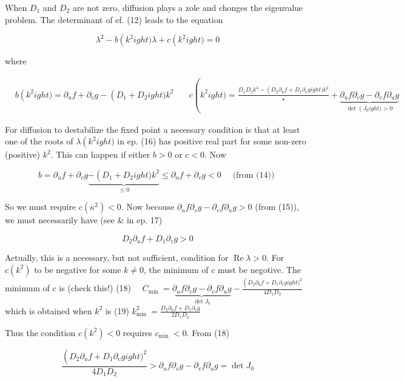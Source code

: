 When $D_{1}$ and $D_{2}$ are not zero, diffusion plays a zole and chonges the eigenvalue problem. The determinant of ef. (12) leads to the equation


\begin{equation*} 
\lambda^{2}-b
\left(k^{2}
ight) \lambda+c
\left(k^{2}
ight)=0 \tag{16}
\end{equation*} 

where

\begin{align*}
& b
\left(k^{2}
ight)=\partial_{u} f+\partial_{v} g-\left(D_{1}+D_{2}
ight) k^{2} \quad \tag{17}
& c
\left(k^{2}
ight)=\frac{D_{1} D_{2} k^{4}-\left(D_{2} \partial_{u} f+D_{1} \partial_{v} g
ight) k^{2}}{\star}+\underbrace{\partial_{u} f \partial_{v} g-\partial_{v} f \partial_{u} g}_{\operatorname{det}
\left(J_{0}
ight)>0}
\end{align*} 

For diffusion to destabilize the fixed point a necessary condition is that at least one of the roots of $\lambda
\left(k^{2}
ight)$ in ep. (16) has positive real part for some non-zero (positive) $k^{2}$. This can happen if either $b>0$ or $c<0$. Now

$$ 
b=\partial_{u} f+\partial_{v} g \underbrace{-\left(D_{1}+D_{2}
ight) k^{2}}_{\leqslant 0} \leqslant \partial_{u} f+\partial_{v} g<0 \quad \text { (from (14)) } $$ 

So we must require $c
\left(\kappa^{2}
\right)<0$. Now becouse $\partial_{u} f \partial_{v} g-\partial_{v} f \partial_{u} g>0$ (from (15)), we must necessarily have (see & in ep. 17)

$$ 
D_{2} \partial_{u} f+D_{1} \partial_{v} g>0
$$ 

Actually, this is a necessary, but not sufficient, condition for $\operatorname{Re} \lambda>0$. For $c
\left(k^{2}
\right)$ to be negative for some $k \neq 0$, the minimum of $c$ must be negotive. The minimum of $c$ is (check this!)
(18) $\quad C_{\text {min }}=\underbrace{\partial_{u} f \partial_{v} g-\partial_{v} f \partial_{u} g}_{\operatorname{det} J_{0}}-\frac{\left(D_{2} \partial_{u} f+D_{1} \partial_{v} g
ight)^{2}}{4 D_{1} D_{2}}$
which is obtained when $k^{2}$ is
(19) $k_{\text {min }}^{2}=\frac{D_{2} \partial_{u} f+D_{1} \partial_{v} g}{2 D_{1} D_{2}}$

Thus the condition $c
\left(k^{2}
\right)<0$ requires $c_{\text {min }}<0$. From (18)

$$ 
\frac{\left(D_{2} \partial_{u} f+D_{1} \partial_{v} g
ight)^{2}}{4 D_{1} D_{2}}>\partial_{u} f \partial_{v} g-\partial_{v} f \partial_{u} g=\operatorname{det} J_{0}
$$ 

